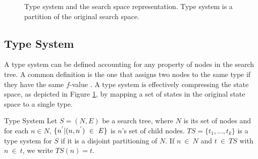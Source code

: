 \begin{figure}[htb]
\caption{Type system and the search space representation. Type system is a partition of the original search space.} \label{fig:ss_ts}
\end{figure}

\subsection{Type System}
A type system can be defined accounting for any property of nodes in the search tree. A common definition is the one that assigns two nodes to the same type if they have the same $f$-value \cite{lelis2013predicting}. A type system is effectively compressing the state space, as depicted in Figure \ref{fig:ss_ts}, by mapping a set of states in the original state space to a single type.

\begin{definition}{Type System}
Let $S = (N,E)$ be a search tree, where $N$ is its set of nodes and for each $n \in N$, $\{n\sp{'}|(n,n\sp{'})\ \in\ E \}$ is $n$'s set of child nodes. $TS = \{t_{1},...,t_{k} \}$ is a type system for $S$ if it is a disjoint partitioning of $N$. If $n\ \in\ N$ and $t\ \in\ TS$ with $n\ \in\ t$, we write $TS(n) = t$.
\end{definition}


